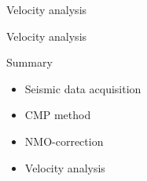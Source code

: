 \begin{frame}{Velocity analysis}
\end{frame}
\begin{frame}{Velocity analysis}
\end{frame}
\begin{frame}{Summary}
\begin{itemize}
  \item Seismic data acquisition
   \item CMP method
   \item NMO-correction
   \item Velocity analysis
  \end{itemize}
%
\end{frame}
